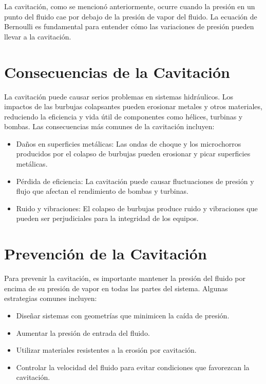 \documentclass[../main]{subfiles}
\begin{document}
La cavitación, como se mencionó anteriormente, ocurre cuando la presión en un punto del fluido cae por debajo de la presión de vapor del fluido. La ecuación de Bernoulli es fundamental para entender cómo las variaciones de presión pueden llevar a la cavitación.

\section{Consecuencias de la Cavitación}

La cavitación puede causar serios problemas en sistemas hidráulicos. Los impactos de las burbujas colapsantes pueden erosionar metales y otros materiales, reduciendo la eficiencia y vida útil de componentes como hélices, turbinas y bombas. Las consecuencias más comunes de la cavitación incluyen:

\begin{itemize}
    \item Daños en superficies metálicas: Las ondas de choque y los microchorros producidos por el colapso de burbujas pueden erosionar y picar superficies metálicas.
    \item Pérdida de eficiencia: La cavitación puede causar fluctuaciones de presión y flujo que afectan el rendimiento de bombas y turbinas.
    \item Ruido y vibraciones: El colapso de burbujas produce ruido y vibraciones que pueden ser perjudiciales para la integridad de los equipos.
\end{itemize}

\section{Prevención de la Cavitación}

Para prevenir la cavitación, es importante mantener la presión del fluido por encima de su presión de vapor en todas las partes del sistema. Algunas estrategias comunes incluyen:

\begin{itemize}
    \item Diseñar sistemas con geometrías que minimicen la caída de presión.
    \item Aumentar la presión de entrada del fluido.
    \item Utilizar materiales resistentes a la erosión por cavitación.
    \item Controlar la velocidad del fluido para evitar condiciones que favorezcan la cavitación.
\end{itemize}
\end{document}
